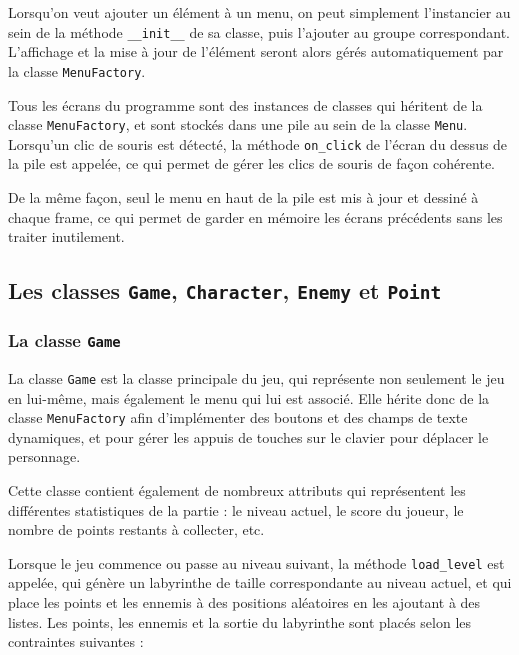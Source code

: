 \documentclass[12pt]{scrreprt} %
\begin{document}
Lorsqu'on veut ajouter un élément à un menu, on peut simplement l'instancier au sein de la méthode \texttt{\_\_init\_\_} de sa classe, puis l'ajouter au groupe correspondant. L'affichage et la mise à jour de l'élément seront alors gérés automatiquement par la classe \texttt{MenuFactory}.

Tous les écrans du programme sont des instances de classes qui héritent de la classe \texttt{MenuFactory}, et sont stockés dans une pile au sein de la classe \texttt{Menu}. Lorsqu'un clic de souris est détecté, la méthode \texttt{on\_click} de l'écran du dessus de la pile est appelée, ce qui permet de gérer les clics de souris de façon cohérente.

De la même façon, seul le menu en haut de la pile est mis à jour et dessiné à chaque frame, ce qui permet de garder en mémoire les écrans précédents sans les traiter inutilement.

\subsection{Les classes \texttt{Game}, \texttt{Character}, \texttt{Enemy} et \texttt{Point}}

\subsubsection{La classe \texttt{Game}}

La classe \texttt{Game} est la classe principale du jeu, qui représente non seulement le jeu en lui-même, mais également le menu qui lui est associé. Elle hérite donc de la classe \texttt{MenuFactory} afin d'implémenter des boutons et des champs de texte dynamiques, et pour gérer les appuis de touches sur le clavier pour déplacer le personnage.

Cette classe contient également de nombreux attributs qui représentent les différentes statistiques de la partie : le niveau actuel, le score du joueur, le nombre de points restants à collecter, etc.

Lorsque le jeu commence ou passe au niveau suivant, la méthode \texttt{load\_level} est appelée, qui génère un labyrinthe de taille correspondante au niveau actuel, et qui place les points et les ennemis à des positions aléatoires en les ajoutant à des listes. Les points, les ennemis et la sortie du labyrinthe sont placés selon les contraintes suivantes :
\end{document}
